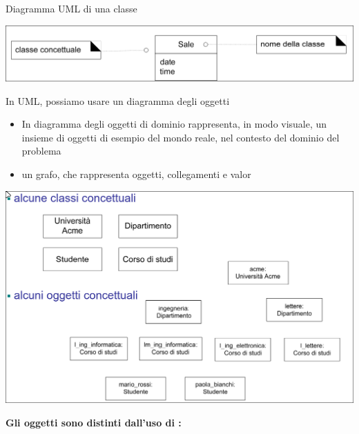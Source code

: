 \documentclass{article}
\begin{document}
Diagramma UML di una classe
\begin{center}
    \includegraphics[width=\textwidth]{images/uml class.png}
\end{center}
In UML, possiamo usare un diagramma degli oggetti
\begin{itemize}
    \item In diagramma degli oggetti di dominio rappresenta, in modo visuale, un insieme di oggetti di esempio del mondo reale, nel contesto del dominio del problema
    \item \Eaccentata un grafo, che rappresenta oggetti, collegamenti e valor
\end{itemize}
\begin{center}
    \includegraphics[width=\textwidth]{images/classi e oggetti concettuali.png}
\end{center}
\Large\textbf{Gli oggetti sono distinti dall'uso di :}\normalsize\\
\end{document}

